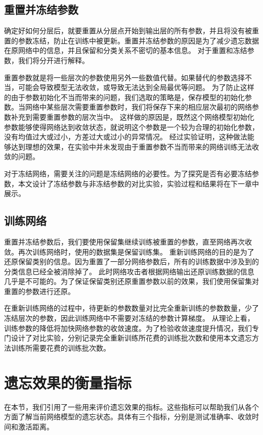 \subsection{重置并冻结参数}
确定好如何分层后，就要重置从分层点开始到输出层的所有参数，并且将没有被重置的参数冻结，防止在训练中被更新。重置并冻结参数的原因是为了减少遗忘数据在原网络中的信息，并且保留和分类关系不密切的基本信息。
对于重置和冻结参数，我们将分开进行解释。

重置参数就是将一些层次的参数使用另外一些数值代替。如果替代的参数选择不当，可能会导致模型无法收敛，或导致无法达到全局最优等问题。
为了防止这样的由于参数初始化不当而带来的问题，我们选取的策略是，保存模型的初始化参数。当网络中某些层次需要重置参数时，我们将保存下来的相应层次最初的网络参数补充到需要重置参数的层次当中。
这样做的原因是，既然这个网络模型初始化参数能够使得网络达到收敛状态，就说明这个参数是一个较为合理的初始化参数，没有均值过大或过小，方差过大或过小的异常情况。
经过实验证明，这种做法能够达到理想的效果，在实验中并未发现由于重置参数不当而带来的网络训练无法收敛的问题。

对于冻结网络，需要关注的问题是冻结网络的必要性。为了探究是否有必要冻结参数，本文设计了冻结参数与非冻结参数的对比实验，实验过程和结果将在下一章中展示。

\subsection{训练网络}
重置并冻结参数后，我们要使用保留集继续训练被重置的参数，直至网络再次收敛。再次训练网络时，使用的数据集是保留训练集。
重新训练网络的目的是为了还原保留类别的信息。因为重置了一部分网络参数后，所有的训练数据中涉及到的分类信息已经全被消除掉了。
此时网络攻击者根据网络输出还原训练数据的信息几乎是不可能的。为了保证保留类别还原重置参数以前的效果，我们使用保留集对重置的参数进行还原。

在重新训练网络的过程中，待更新的参数数量对比完全重新训练的参数数量，少了冻结层次的参数，因此训练网络中不需要对冻结的参数计算梯度。
从理论上看，训练参数的降低将加快网络参数的收敛速度。为了检验收敛速度提升情况，我们专门设计了对比实验，分别记录完全重新训练所花费的训练批次数和使用本文遗忘方法训练所需要花费的训练批次数。

\section{遗忘效果的衡量指标} \label{forget_evaluation_index}
在本节，我们引用了一些用来评价遗忘效果的指标。这些指标可以帮助我们从各个方面了解当前网络模型的遗忘状态。具体有三个指标，分别是测试准确率、收敛时间和激活距离。


